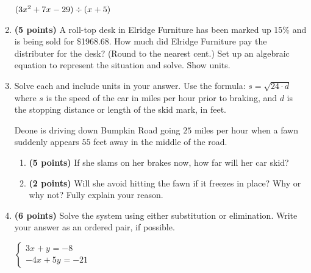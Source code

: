 \documentclass[12pt]{amsart}
\begin{document}
\begin{enumerate}
$(3x^{2}+7x^{}-29) \div (x^{}+5)$

\vfill  \vfill \vfill
\newpage\def \discount{15}\def \paid{1968.68}\def \rainy{9.18}\def \orcost{2316.09}\def \purcost{1711.90}\def \orrainy{10.80}
\item {\bf (5 points)} 
 A roll-top desk in Elridge Furniture has been marked up \discount\% and is being sold for \$\paid. How much did Elridge Furniture pay the distributer for the desk? (Round to the nearest cent.) Set up an algebraic equation to represent the situation and solve. Show units.

\vfill 
\def \insvar{24}\def \d{55}\def \zerospeed{36.33}\def \slimit{25}\def \s{42}\def \skidd{73.5}\def \safed{26.042}\def \rsafed{26}

 
\item Solve each and include units in your answer. Use the formula: $s = \sqrt{\insvar \cdot d}$ where $s$ is the speed of the car in miles per hour prior to braking, and $d$ is the stopping distance or length of the skid mark, in feet. 

\vspace{3mm}

Deone is driving down Bumpkin Road going $\slimit$ miles per hour when a fawn suddenly appears $\d$ feet away in the middle of the road. \begin{enumerate}
\item {\bf (5 points)} If she slams on her brakes now, how far will her car skid? \vspace{4cm}
\item {\bf (2 points)} Will she avoid hitting the fawn if it freezes in place? Why or why not? Fully explain your reason. \vspace{3cm}
\end{enumerate}


\newpage\def \xis{-1}\def \yis{-5}\def \nomatcho{[2,5,3,2]}\def \a{-2}\def \c{-5}\def \b{-3}\def \d{2}\def \polyonesol{17}\def \polytwosol{-5}\def \xgoodone{-2x^{}}\def \ygoodone{-3y^{}}\def \xgoodtwo{-5x^{}}\def \ygoodtwo{+2y^{}}\def \unitize{[0,1,0,0,1,0]}\def \mtem{3}\def \ntem{4}\def \ptem{-4}\def \qtem{5}\def \m{3}\def \n{1}\def \p{-4}\def \q{5}\def \polytonesol{-8}\def \polyttwosol{-21}\def \xtgoodone{3x^{}}\def \ytgoodone{+y^{}}\def \xtgoodtwo{-4x^{}}\def \ytgoodtwo{+5y^{}}
\item {\bf (6 points)} 
 Solve the system using either substitution or elimination. Write your answer as an ordered pair, if possible. 

$ \begin{cases} \xtgoodone \ytgoodone = \polytonesol \\
\xtgoodtwo \ytgoodtwo = \polyttwosol
\end{cases}$


\end{enumerate}
\end{document}
